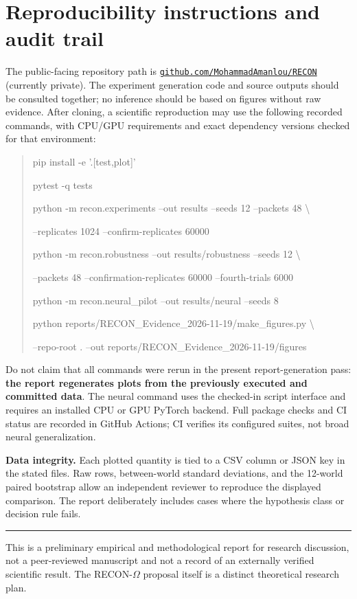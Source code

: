 \documentclass[10.5pt,a4paper]{article}
\begin{document}
\section{Reproducibility instructions and audit trail}
The public-facing repository path is \href{https://github.com/MohammadAmanlou/RECON}{\texttt{github.com/MohammadAmanlou/RECON}} (currently private). The experiment generation code and source outputs should be consulted together; no inference should be based on figures without raw evidence. After cloning, a scientific reproduction may use the following recorded commands, with CPU/GPU requirements and exact dependency versions checked for that environment:
\begin{quote}\ttfamily\scriptsize
pip install -e '.[test,plot]'\par
pytest -q tests\par
python -m recon.experiments --out results --seeds 12 --packets 48 \textbackslash\par\hspace*{3em}--replicates 1024 --confirm-replicates 60000\par
python -m recon.robustness --out results/robustness --seeds 12 \textbackslash\par\hspace*{3em}--packets 48 --confirmation-replicates 60000 --fourth-trials 6000\par
python -m recon.neural\_pilot --out results/neural --seeds 8\par
python reports/RECON\_Evidence\_2026-11-19/make\_figures.py \textbackslash\par\hspace*{3em}--repo-root . --out reports/RECON\_Evidence\_2026-11-19/figures
\end{quote}
Do not claim that all commands were rerun in the present report-generation pass: \textbf{the report regenerates plots from the previously executed and committed data}. The neural command uses the checked-in script interface and requires an installed CPU or GPU PyTorch backend. Full package checks and CI status are recorded in GitHub Actions; CI verifies its configured suites, not broad neural generalization.

\textbf{Data integrity.} Each plotted quantity is tied to a CSV column or JSON key in the stated files. Raw rows, between-world standard deviations, and the 12-world paired bootstrap allow an independent reviewer to reproduce the displayed comparison. The report deliberately includes cases where the hypothesis class or decision rule fails.

\vspace{5mm}\hrule\vspace{2mm}
{\footnotesize\color{slate}This is a preliminary empirical and methodological report for research discussion, not a peer-reviewed manuscript and not a record of an externally verified scientific result. The RECON-$\Omega$ proposal itself is a distinct theoretical research plan.}
\end{document}
